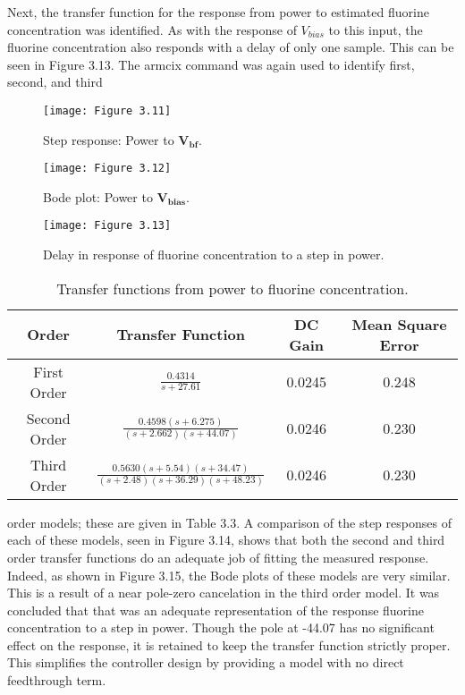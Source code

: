 Next, the transfer function for the response from power to estimated fluorine concentration was identified. As with the response of $V_{bias}$ to this input, the fluorine concentration
also responds with a delay of only one sample. This can be seen in Figure 3.13. The armcix command was again used to identify first, second, and third



\begin{figure}[H]
	\centering
	\texttt{[image: Figure 3.11]}
	\bf\caption{ Step response: Power to $\mathbf{V_{bf}}$.}
	\label{fig:3.11}
\end{figure}

\begin{figure}[H]
	\centering
	\texttt{[image: Figure 3.12]}
	\bf\caption{ Bode plot: Power to $\mathbf{V_{bias}}$.}
	\label{fig:3.12}
\end{figure}

\begin{figure}[H]
	\centering
	\texttt{[image: Figure 3.13]}
	\bf\caption{  Delay in response of fluorine concentration to a step in power.}
	\label{fig:3.13}
\end{figure}

\begin{table}[H]
	\centering
	\renewcommand{\arraystretch}{2}
	\begin{tabular}{|c|c|c|c|}
		\hline
		Order & Transfer Function & DC Gain & Mean Square Error \\
		\hline 
		First Order & \large{$\frac{0.4314}{s+27.61}$} & 0.0245 & 0.248 \\
		\hline
		Second Order & \large{$\frac{0.4598(s+6.275)}{(s+2.662)(s+44.07)}$} & 0.0246 & 0.230 \\
		\hline
		Third Order & \large{$\frac{0.5630(s+5.54)(s+34.47)}{(s+2.48)(s+36.29)(s+48.23)}$} & 0.0246 & 0.230 \\
		\hline
	\end{tabular}
	\renewcommand{\arraystretch}{1}
	\bf\caption{ Transfer functions from power to fluorine concentration.}
	\label{Table:3.3}
\end{table}

\noindent  order models; these are given in Table 3.3. A comparison of the step responses of each of these models, seen in Figure 3.14, shows that both the second and third order transfer functions do an adequate job of fitting the measured response. Indeed, as shown in Figure 3.15, the Bode plots of these models are very similar. This is a result of a near pole-zero cancelation in the third order model. It was concluded that that was an adequate representation of the response fluorine concentration to a step in power. Though the pole at -44.07 has no significant effect on the response, it is retained to keep
the transfer function strictly proper. This simplifies the controller design by providing a model with no direct feedthrough term.

